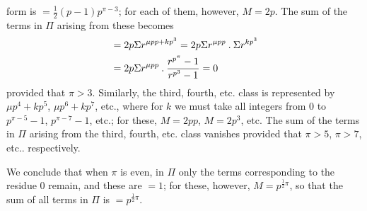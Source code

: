 form is $=\frac12(p-1)p^{\pi-3}$; for each of them, however, $M=2p$. The sum of the terms in $\Pi$ arising from these becomes
\[
\begin{aligned}
&=2p\Sigma r^{\mu pp+kp^3}=2p\Sigma r^{\mu pp}\mathbin{.}\Sigma r^{kp^3}\\
&=2p\Sigma r^{\mu pp}\mathbin{.}\frac{r^{p^\pi}-1}{r^{p^3}-1}=0
\end{aligned}
\]
provided that $\pi>3$. Similarly, the third, fourth, etc. class is represented by $\mu p^4+kp^5$, $\mu p^6+kp^7$, etc., where for $k$ we must take all integers from $0$ to $p^{\pi-5}-1$, $p^{\pi-7}-1$, etc.; for these, $M=2pp$, $M=2p^3$, etc. The sum of the terms in $\Pi$ arising from the third, fourth, etc. class vanishes provided that $\pi>5$, $\pi>7$, etc.. respectively.
\par We conclude that when $\pi$ is even, in $\Pi$ only the terms corresponding to the residue $0$ remain, and these are $=1$; for these, however, $M=p^{\frac12\pi}$, so that the sum of all terms in $\Pi$ is $=p^{\frac12\pi}$.
